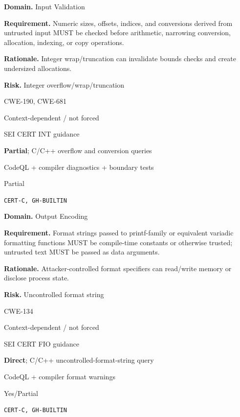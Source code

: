 \documentclass[10pt,letterpaper]{article}
\newcommand{\prioritybadge}[2]{\tcbox[on line,boxrule=0pt,arc=1.2mm,boxsep=0.7mm,left=1mm,right=1mm,top=0.4mm,bottom=0.4mm,colback=#2!12,coltext=#2]{\scriptsize\bfseries #1}}
\begin{document}
\begin{rulebox}[title={\texttt{SCS-C-INPUT-001} \hfill \prioritybadge{High Priority}{High}}]
\textbf{Domain.} Input Validation

\textbf{Requirement.} Numeric sizes, offsets, indices, and conversions derived from untrusted input MUST be checked before arithmetic, narrowing conversion, allocation, indexing, or copy operations.

\textbf{Rationale.} Integer wrap/truncation can invalidate bounds checks and create undersized allocations.

\textbf{Risk.} Integer overflow/wrap/truncation

\begin{description}[leftmargin=2.65cm,labelwidth=2.3cm,style=nextline,itemsep=1pt,topsep=3pt]
  \item[CWE] CWE-190, CWE-681
  \item[OWASP] Context-dependent / not forced
  \item[CERT] SEI CERT INT guidance
  \item[CodeQL] \textbf{Partial}; C/C++ overflow and conversion queries
  \item[Enforcement] CodeQL + compiler diagnostics + boundary tests
  \item[Automation] Partial
  \item[Sources] \texttt{CERT-C, GH-BUILTIN}
\end{description}
\end{rulebox}

\begin{rulebox}[title={\texttt{SCS-C-OUTPUT-001} \hfill \prioritybadge{High Priority}{High}}]
\textbf{Domain.} Output Encoding

\textbf{Requirement.} Format strings passed to printf-family or equivalent variadic formatting functions MUST be compile-time constants or otherwise trusted; untrusted text MUST be passed as data arguments.

\textbf{Rationale.} Attacker-controlled format specifiers can read/write memory or disclose process state.

\textbf{Risk.} Uncontrolled format string

\begin{description}[leftmargin=2.65cm,labelwidth=2.3cm,style=nextline,itemsep=1pt,topsep=3pt]
  \item[CWE] CWE-134
  \item[OWASP] Context-dependent / not forced
  \item[CERT] SEI CERT FIO guidance
  \item[CodeQL] \textbf{Direct}; C/C++ uncontrolled-format-string query
  \item[Enforcement] CodeQL + compiler format warnings
  \item[Automation] Yes/Partial
  \item[Sources] \texttt{CERT-C, GH-BUILTIN}
\end{description}
\end{rulebox}
\end{document}
